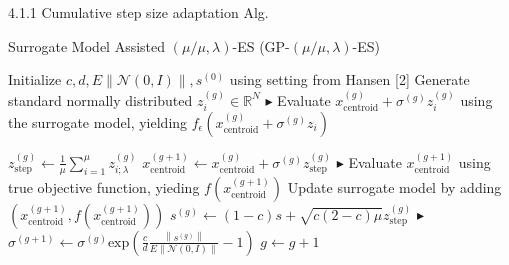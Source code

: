 \documentclass{beamer}
\begin{document}
\begin{frame}{4.1.1 Cumulative step size adaptation Alg.}

\begin{block}{Surrogate Model Assisted $(\mu/\mu,\lambda)$-ES (GP-$(\mu/\mu,\lambda)$-ES)}
 \footnotesize{
    \begin{algorithm}[H]
    \begin{algorithmic}[1]
        \STATE Initialize $c,d,E \left\lVert \mathcal{N}(0,I) \right\rVert,s^{(0)}$  using setting from Hansen [2]
        		\STATE Generate standard normally distributed $z_i^{(g)} \in \mathbb{R}^N $  \hfill$\blacktriangleright$ %
        		\STATE Evaluate $x_{\text{centroid}}^{(g)} + \sigma^{(g)} z_i^{(g)}$ using the surrogate model, yielding $f_{\epsilon}(x_{\text{centroid}}^{(g)} + \sigma^{(g)} z_i)$
        		
        	\ENDFOR
        	\STATE $z_{\text{step}}^{(g)} \leftarrow \frac{1}{\mu}\sum_{i=1}^{\mu} z_{i;\lambda}^{(g)}$ \hfill {} %
        	\STATE $x_{\text{centroid}}^{(g+1)} \leftarrow  x_{\text{centroid}}^{(g)} + \sigma^{(g)} z_{\text{step}}^{(g)}$  
        	\hfill$\blacktriangleright$ %
        	\STATE Evaluate $x_{\text{centroid}}^{(g+1)}$ using true objective function, yieding $f(x_{\text{centroid}}^{(g+1)})$
        	\STATE Update surrogate model by adding $(x_{\text{centroid}}^{(g+1)},f(x_{\text{centroid}}^{(g+1)}))$
        	\STATE $s^{(g)} \leftarrow (1-c)s + \sqrt{ c(2-c) \mu} z_{\text{step}}^{(g)}$  \hfill$\blacktriangleright$ %
        	\STATE $\sigma^{(g+1)} \leftarrow \sigma^{(g)}  \text{exp} \left(\frac{c}{d} \frac{\left\lVert s^{(g)} \right\rVert} { E \left\lVert \mathcal{N}(0,I) \right\rVert} -1 \right )$
        	\STATE $g \leftarrow g + 1$
        \ENDWHILE
    \end{algorithmic}
    \end{algorithm}
}
\end{block}

\end{frame}
\end{document}
